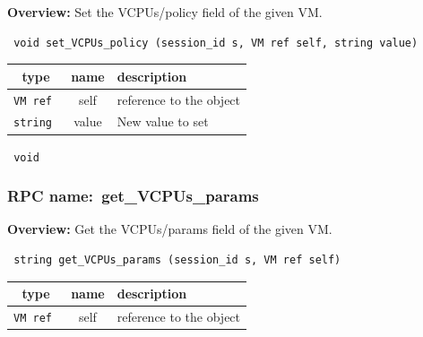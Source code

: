 {\bf Overview:} 
Set the VCPUs/policy field of the given VM.

\begin{verbatim} void set_VCPUs_policy (session_id s, VM ref self, string value)\end{verbatim}



 
\vspace{0.3cm}
\begin{tabular}{|c|c|p{7cm}|}
 \hline
{\bf type} & {\bf name} & {\bf description} \\ \hline
{\tt VM ref } & self & reference to the object \\ \hline 

{\tt string } & value & New value to set \\ \hline 

\end{tabular}

\vspace{0.3cm}

{\tt 
void
}



\vspace{0.3cm}
\vspace{0.3cm}
\vspace{0.3cm}
\subsubsection{RPC name:~get\_VCPUs\_params}

{\bf Overview:} 
Get the VCPUs/params field of the given VM.

\begin{verbatim} string get_VCPUs_params (session_id s, VM ref self)\end{verbatim}



 
\vspace{0.3cm}
\begin{tabular}{|c|c|p{7cm}|}
 \hline
{\bf type} & {\bf name} & {\bf description} \\ \hline
{\tt VM ref } & self & reference to the object \\ \hline 

\end{tabular}

\vspace{0.3cm}

